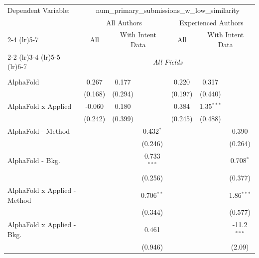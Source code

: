 \begingroup
\centering
\begin{tabular}{lcccccc}
   \tabularnewline \midrule \midrule
   Dependent Variable: & \multicolumn{6}{c}{num\_primary\_submissions\_w\_low\_similarity}\\
 & \multicolumn{3}{c}{All Authors} & \multicolumn{3}{c}{Experienced Authors} \\
\cmidrule(lr){2-4} \cmidrule(lr){5-7}
 & \multicolumn{1}{c}{All} & \multicolumn{2}{c}{With Intent Data} & \multicolumn{1}{c}{All} & \multicolumn{2}{c}{With Intent Data} \\
\cmidrule(lr){2-2} \cmidrule(lr){3-4} \cmidrule(lr){5-5} \cmidrule(lr){6-7}
 & \multicolumn{6}{c}{\textit{All Fields}} \\ \\
   AlphaFold                      & 0.267   & 0.177        &               & 0.220         & 0.317        &   \\   
                                  & (0.168) & (0.294)      &               & (0.197)       & (0.440)      &   \\   
   AlphaFold x Applied            & -0.060  & 0.180        &               & 0.384         & 1.35$^{***}$ &   \\   
                                  & (0.242) & (0.399)      &               & (0.245)       & (0.488)      &   \\   
   AlphaFold - Method             &         &              & 0.432$^{*}$   &               &              & 0.390\\   
                                  &         &              & (0.246)       &               &              & (0.264)\\   
   AlphaFold - Bkg.               &         &              & 0.733$^{***}$ &               &              & 0.708$^{*}$\\   
                                  &         &              & (0.256)       &               &              & (0.377)\\   
   AlphaFold x Applied - Method   &         &              & 0.706$^{**}$  &               &              & 1.86$^{***}$\\   
                                  &         &              & (0.344)       &               &              & (0.577)\\   
   AlphaFold x Applied - Bkg.     &         &              & 0.461         &               &              & -11.2$^{***}$\\   
                                  &         &              & (0.946)       &               &              & (2.09)\\   

\end{tabular}
